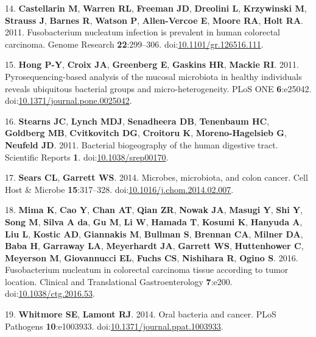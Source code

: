 \documentclass[11pt,]{article}
\begin{document}
\hypertarget{ref-Castellarin2011}{}
14. \textbf{Castellarin M}, \textbf{Warren RL}, \textbf{Freeman JD},
\textbf{Dreolini L}, \textbf{Krzywinski M}, \textbf{Strauss J},
\textbf{Barnes R}, \textbf{Watson P}, \textbf{Allen-Vercoe E},
\textbf{Moore RA}, \textbf{Holt RA}. 2011. Fusobacterium nucleatum
infection is prevalent in human colorectal carcinoma. Genome Research
\textbf{22}:299--306.
doi:\href{https://doi.org/10.1101/gr.126516.111}{10.1101/gr.126516.111}.

\hypertarget{ref-Hong2011}{}
15. \textbf{Hong P-Y}, \textbf{Croix JA}, \textbf{Greenberg E},
\textbf{Gaskins HR}, \textbf{Mackie RI}. 2011. Pyrosequencing-based
analysis of the mucosal microbiota in healthy individuals reveals
ubiquitous bacterial groups and micro-heterogeneity. PLoS ONE
\textbf{6}:e25042.
doi:\href{https://doi.org/10.1371/journal.pone.0025042}{10.1371/journal.pone.0025042}.

\hypertarget{ref-Stearns2011}{}
16. \textbf{Stearns JC}, \textbf{Lynch MDJ}, \textbf{Senadheera DB},
\textbf{Tenenbaum HC}, \textbf{Goldberg MB}, \textbf{Cvitkovitch DG},
\textbf{Croitoru K}, \textbf{Moreno-Hagelsieb G}, \textbf{Neufeld JD}.
2011. Bacterial biogeography of the human digestive tract. Scientific
Reports \textbf{1}.
doi:\href{https://doi.org/10.1038/srep00170}{10.1038/srep00170}.

\hypertarget{ref-Sears2014}{}
17. \textbf{Sears CL}, \textbf{Garrett WS}. 2014. Microbes, microbiota,
and colon cancer. Cell Host \& Microbe \textbf{15}:317--328.
doi:\href{https://doi.org/10.1016/j.chom.2014.02.007}{10.1016/j.chom.2014.02.007}.

\hypertarget{ref-Mima2016}{}
18. \textbf{Mima K}, \textbf{Cao Y}, \textbf{Chan AT}, \textbf{Qian ZR},
\textbf{Nowak JA}, \textbf{Masugi Y}, \textbf{Shi Y}, \textbf{Song M},
\textbf{Silva A da}, \textbf{Gu M}, \textbf{Li W}, \textbf{Hamada T},
\textbf{Kosumi K}, \textbf{Hanyuda A}, \textbf{Liu L}, \textbf{Kostic
AD}, \textbf{Giannakis M}, \textbf{Bullman S}, \textbf{Brennan CA},
\textbf{Milner DA}, \textbf{Baba H}, \textbf{Garraway LA},
\textbf{Meyerhardt JA}, \textbf{Garrett WS}, \textbf{Huttenhower C},
\textbf{Meyerson M}, \textbf{Giovannucci EL}, \textbf{Fuchs CS},
\textbf{Nishihara R}, \textbf{Ogino S}. 2016. Fusobacterium nucleatum in
colorectal carcinoma tissue according to tumor location. Clinical and
Translational Gastroenterology \textbf{7}:e200.
doi:\href{https://doi.org/10.1038/ctg.2016.53}{10.1038/ctg.2016.53}.

\hypertarget{ref-Whitmore2014}{}
19. \textbf{Whitmore SE}, \textbf{Lamont RJ}. 2014. Oral bacteria and
cancer. PLoS Pathogens \textbf{10}:e1003933.
doi:\href{https://doi.org/10.1371/journal.ppat.1003933}{10.1371/journal.ppat.1003933}.
\end{document}
